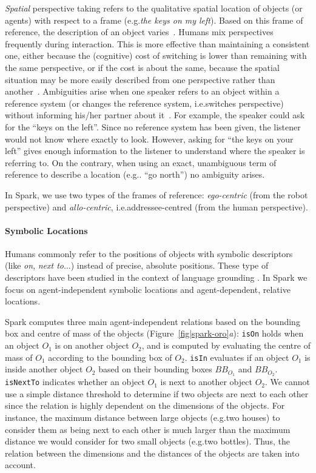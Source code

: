 \documentclass[preprint,3p,times]{elsarticle}
\newcommand{\concept}[1]{{\small \texttt{#1}}}
\newcommand{\ie}{{i.e.\xspace}}
\newcommand{\eg}{{e.g.\xspace}}
\begin{document}
\emph{Spatial} perspective taking refers to the qualitative spatial location of
objects (or agents) with respect to a frame (\eg \emph{the keys on my left}).
Based on this frame of reference, the description of an object
varies~\cite{Marin2008}. Humans mix perspectives frequently during interaction.
This is more effective than maintaining a consistent one, either because the
(cognitive) cost of switching is lower than remaining with the same
perspective, or if the cost is about the same, because the spatial situation
may be more easily described from one perspective rather than
another~\cite{Tversky1999}. Ambiguities arise when one speaker refers to an
object within a reference system (or changes the reference system, \ie switches
perspective) without informing his/her partner about it~\cite{Breazeal2006,
Ros2010}. For example, the speaker could ask for the ``keys on the left''.
Since no reference system has been given, the listener would not know where
exactly to look.  However, asking for ``the keys on your left'' gives enough
information to the listener to understand where the speaker is referring to. On
the contrary, when using an exact, unambiguous term of reference to describe a
location (\eg. ``go north'') no ambiguity arises.

In {\sc Spark}, we use two types of the frames of reference: \emph{ego-centric}
(from the robot perspective) and \emph{allo-centric}, \ie addressee-centred
(from the human perspective).

\paragraph{Symbolic Locations}

Humans commonly refer to the positions of objects with symbolic descriptors
(like \emph{on}, \emph{next to}...) instead of precise, absolute positions.
These type of descriptors have been studied in the context of language
grounding \cite{O'Keefe1999,Matuszek2010,Regier2001,Kelleher2006,Blisard2005}.
In {\sc Spark} we focus on agent-independent symbolic locations and agent-dependent,
relative locations.

{\sc Spark} computes three main agent-independent relations based on the
bounding box and centre of mass of the objects
(Figure~\ref{fig|spark-oro}\emph{a}): \concept{isOn} holds when an object $O_1$
is on another object $O_2$, and is computed by evaluating the centre of mass of
$O_1$ according to the bounding box of $O_2$.  \concept{isIn} evaluates if an
object $O_1$ is inside another object $O_2$ based on their bounding boxes
$BB_{O_1}$ and $BB_{O_2}$.  \concept{isNextTo} indicates whether an object $O_1$
is next to another object $O_2$. We cannot use a simple distance threshold to
determine if two objects are next to each other since the relation is highly
dependent on the dimensions of the objects. For instance, the maximum distance
between large objects (\eg two houses) to consider them as being next to each
other is much larger than the maximum distance we would consider for two small
objects (\eg two bottles). Thus, the relation between the dimensions and the
distances of the objects are taken into account.  
\end{document}
